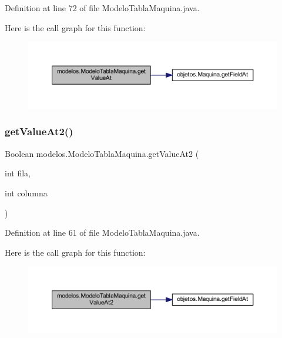 Definition at line 72 of file Modelo\+Tabla\+Maquina.\+java.

Here is the call graph for this function\+:
\nopagebreak
\begin{figure}[H]
\begin{center}
\leavevmode
\includegraphics[width=350pt]{classmodelos_1_1_modelo_tabla_maquina_ae6611198ecf631949ddb041b8231da95_cgraph}
\end{center}
\end{figure}
\mbox{\label{classmodelos_1_1_modelo_tabla_maquina_a76d930fbec2a211e91095ac641f030cb}} 
\subsubsection{\texorpdfstring{get\+Value\+At2()}{getValueAt2()}}
{\footnotesize\ttfamily Boolean modelos.\+Modelo\+Tabla\+Maquina.\+get\+Value\+At2 (\begin{DoxyParamCaption}\item[{int}]{fila,  }\item[{int}]{columna }\end{DoxyParamCaption})}



Definition at line 61 of file Modelo\+Tabla\+Maquina.\+java.

Here is the call graph for this function\+:
\nopagebreak
\begin{figure}[H]
\begin{center}
\leavevmode
\includegraphics[width=350pt]{classmodelos_1_1_modelo_tabla_maquina_a76d930fbec2a211e91095ac641f030cb_cgraph}
\end{center}
\end{figure}
\mbox{\label{classmodelos_1_1_modelo_tabla_maquina_ab81f2b02aa2cc4c0f9c93111ba345df8}} 

